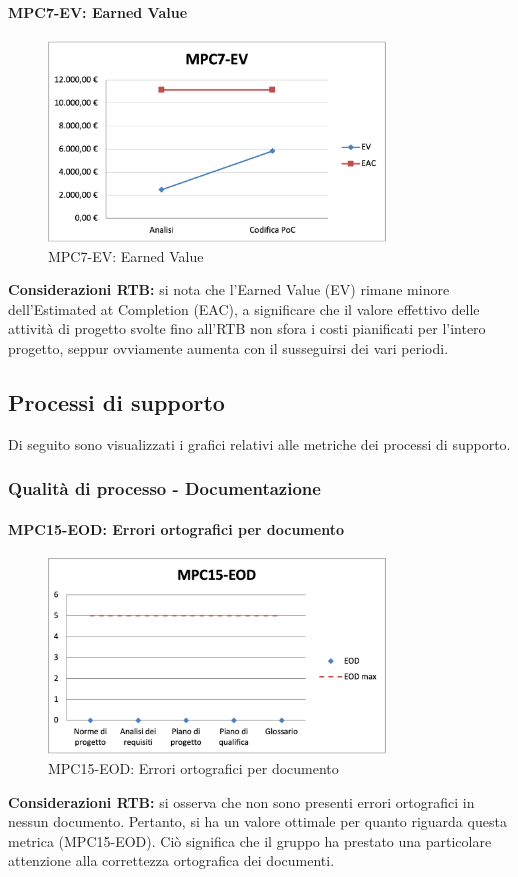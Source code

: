 \paragraph{MPC7-EV: Earned Value}
\begin{figure}[h!] 
    \centering
    \includegraphics[width=0.8\textwidth]{images/MPC7-EV.png}
    \caption{MPC7-EV: Earned Value}
\end{figure}
\noindent \textbf{Considerazioni RTB:} si nota che l'Earned Value (EV) rimane minore dell'Estimated at Completion (EAC), a significare che il valore effettivo delle attività di progetto svolte fino all'RTB non sfora i costi pianificati per l'intero progetto, seppur ovviamente aumenta con il susseguirsi dei vari periodi.

\subsection{Processi di supporto} \label{sec:processi_di_supporto}
Di seguito sono visualizzati i grafici relativi alle metriche dei processi di supporto.
\subsubsection{Qualità di processo - Documentazione}
\paragraph{MPC15-EOD: Errori ortografici per documento}
\begin{figure}[h!] 
    \centering
    \includegraphics[width=0.8\textwidth]{images/MPC15-EOD.png}
    \caption{MPC15-EOD: Errori ortografici per documento}
\end{figure}
\noindent \textbf{Considerazioni RTB:} si osserva che non sono presenti errori ortografici in nessun documento. Pertanto, si ha un valore ottimale per quanto riguarda questa metrica (MPC15-EOD). Ciò significa che il gruppo ha prestato una particolare attenzione alla correttezza ortografica dei documenti.


